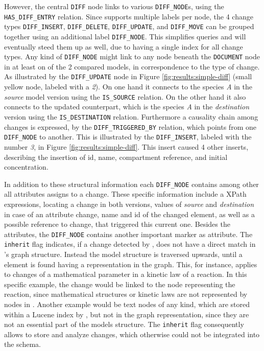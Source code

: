 However, the central \texttt{DIFF} node links to various \texttt{DIFF\_NODE}s, using the \texttt{HAS\_DIFF\_ENTRY} relation. Since \neoj supports multiple labels per node, the 4 change types \texttt{DIFF\_INSERT}, \texttt{DIFF\_DELETE}, \texttt{DIFF\_UPDATE}, and \texttt{DIFF\_MOVE} can be grouped together using an additional label \texttt{DIFF\_NODE}. This simplifies queries and will eventually steed them up as well, due to having a single index for all change types.
Any kind of \texttt{DIFF\_NODE} might link to any node beneath the \texttt{DOCUMENT} node in at least on of the 2 compared models, in correspondence to the type of change.
As illustrated by the \texttt{DIFF\_UPDATE} node in Figure \ref{fig:results:simple-diff} (small yellow node, labeled with a \emph{2}). On one hand it connects to the species \emph{A} in the \emph{source} model version using the \texttt{IS\_SOURCE} relation. On the other hand it also connects to the updated counterpart, which is the species \emph{A} in the \emph{destination} version using the \texttt{IS\_DESTINATION} relation.
Furthermore a causality chain among changes is expressed, by the \texttt{DIFF\_TRIGGERED\_BY} relation, which points from one \texttt{DIFF\_NODE} to another. This is illustrated by the \texttt{DIFF\_INSERT}, labeled with the number \emph{3}, in Figure \ref{fig:results:simple-diff}. This insert caused 4 other inserts, describing the insertion of id, name, compartment reference, and initial concentration.

In addition to these structural information each \texttt{DIFF\_NODE} contains among other all attributes \bives assigns to a change. These \bives specific information include a XPath expressions, locating a change in both versions, values of \emph{source} and \emph{destination} in case of an attribute change, name and id of the changed element, as well as a possible reference to change, that triggered this current one.
Besides the \bives attributes, the \texttt{DIFF\_NODE} contains another important marker as attribute.
The \texttt{inherit} flag indicates, if a change detected by \bives, does not have a direct match in \masymos's graph structure. Instead the model structure is traversed  upwards, until a element is found having a representation in the \masymos graph.
This, for instance, applies to changes of a mathematical parameter in a kinetic law of a reaction. In this specific example, the change would be linked to the node representing the reaction, since mathematical structures or kinetic laws are not represented by nodes in \masymos. Another example would be text nodes of any kind, which are stored within a Lucene index by \masymos, but not in the graph representation, since they are not an essential part of the models structure.
The \texttt{inherit} flag consequently allows to store and analyze changes, which otherwise could not be integrated into the schema.


